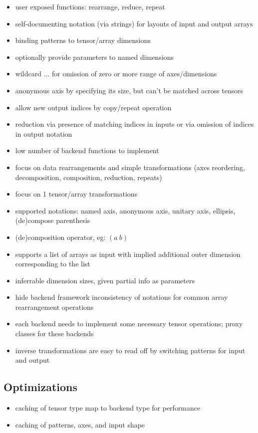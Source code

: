 \documentclass[8pt]{extarticle}
\begin{document}
\begin{multicols*}{2}
  \begin{itemize}
  \item user exposed functions: rearrange, reduce, repeat
  \item self-documenting notation (via strings) for layouts of input and output arrays
  \item binding patterns to tensor/array dimensions
  \item optionally provide parameters to named dimensions
  \item wildcard $...$ for omission of zero or more range of axes/dimensions
  \item anonymous axis by specifying its size, but can't be matched across tensors
  \item allow new output indices by copy/repeat operation
  \item reduction via presence of matching indices in inputs or via omission of indices in output notation
  \item low number of backend functions to implement
  \item focus on data rearrangements and simple transformations (axes reordering, decomposition, composition, reduction, repeats)
  \item focus on 1 tensor/array transformations
  \item supported notations: named axis, anonymous axis, unitary axis, ellipsis, (de)compose parenthesis
  \item (de)composition operator, eg: $(a\ b)$
  \item supports a list of arrays as input with implied additional outer dimension corresponding to the list
  \item inferrable dimension sizes, given partial info as parameters
  \item hide backend framework inconsistency of notations for common array rearrangement operations
  \item each backend needs to implement some necessary tensor operations; proxy classes for these backends
  \item inverse transformations are easy to read off by switching patterns for input and output
  \end{itemize}

  \subsection{Optimizations}
  \begin{itemize}
  \item caching of tensor type map to backend type for performance
  \item caching of patterns, axes, and input shape\\


\end{itemize}
\end{multicols*}
\end{document}
